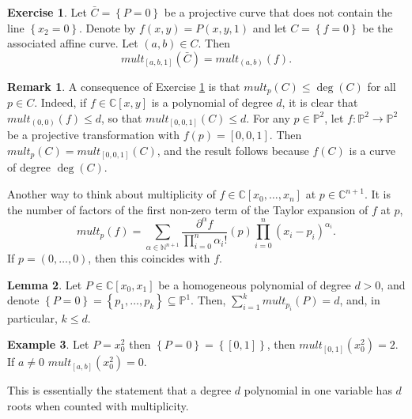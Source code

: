 \documentclass{article}
\newcommand{\N}{\mathbb{N}}
\newcommand{\C}{\mathbb{C}}
\renewcommand{\P}{\mathbb{P}}
\newcommand{\rb}[1]{\left( #1 \right)}
\renewcommand{\sb}[1]{\left[ #1 \right]}
\newcommand{\cb}[1]{\left\{ #1 \right\}}
\theoremstyle{definition}\newtheorem{definition}{Definition}[section]
\theoremstyle{definition}\newtheorem{notation}[definition]{Notation}
\theoremstyle{definition}\newtheorem{remark}[definition]{Remark}
\theoremstyle{definition}\newtheorem{example}[definition]{Example}
\theoremstyle{definition}\newtheorem{fact}{Fact}
\theoremstyle{definition}\newtheorem{exercise}{Exercise}
\newtheorem{lemma}[definition]{Lemma}
\begin{document}
\begin{exercise}
\label{ex:31}
Let $ \bar{C} = \cb{P = 0} $ be a projective curve that does not contain the line $ \cb{x_2 = 0} $. Denote by $ f\rb{x, y} = P\rb{x, y, 1} $ and let $ C = \cb{f = 0} $ be the associated affine curve. Let $ \rb{a, b} \in C $. Then
$$ mult_{\sb{a, b, 1}}\rb{\bar{C}} = mult_{\rb{a, b}}\rb{f}. $$
\end{exercise}

\begin{remark}
\label{rem:11.4}
A consequence of Exercise \ref{ex:31} is that $ mult_p\rb{C} \le \deg\rb{C} $ for all $ p \in C $. Indeed, if $ f \in \C\sb{x, y} $ is a polynomial of degree $ d $, it is clear that $ mult_{\rb{0, 0}}\rb{f} \le d $, so that $ mult_{\sb{0, 0, 1}}\rb{C} \le d $. For any $ p \in \P^2 $, let $ f : \P^2 \to \P^2 $ be a projective transformation with $ f\rb{p} = \sb{0, 0, 1} $. Then $ mult_p\rb{C} = mult_{\sb{0, 0, 1}}\rb{C} $, and the result follows because $ f\rb{C} $ is a curve of degree $ \deg\rb{C} $.
\end{remark}

Another way to think about multiplicity of $ f \in \C\sb{x_0, \dots, x_n} $ at $ p \in \C^{n + 1} $. It is the number of factors of the first non-zero term of the Taylor expansion of $ f $ at $ p $,
$$ mult_p\rb{f} = \sum_{\alpha \in \N^{n + 1}} \dfrac{\partial^\alpha f}{\prod_{i = 0}^n \alpha_i!}\rb{p}\prod_{i = 0}^n \rb{x_i - p_i}^{\alpha_i}. $$
If $ p = \rb{0, \dots, 0} $, then this coincides with $ f $.

\begin{lemma}
\label{lem:11.5}
Let $ P \in \C\sb{x_0, x_1} $ be a homogeneous polynomial of degree $ d > 0 $, and denote $ \cb{P = 0} = \cb{p_1, \dots, p_k} \subseteq \P^1 $. Then, $ \sum_{i = 1}^k mult_{p_i}\rb{P} = d $, and, in particular, $ k \le d $.
\end{lemma}

\begin{example}
Let $ P = x_0^2 $ then $ \cb{P = 0} = \cb{\sb{0, 1}} $, then $ mult_{\sb{0, 1}}\rb{x_0^2} = 2 $. If $ a \ne 0 $ $ mult_{\sb{a, b}}\rb{x_0^2} = 0 $.
\end{example}

This is essentially the statement that a degree $ d $ polynomial in one variable has $ d $ roots when counted with multiplicity.
\end{document}
